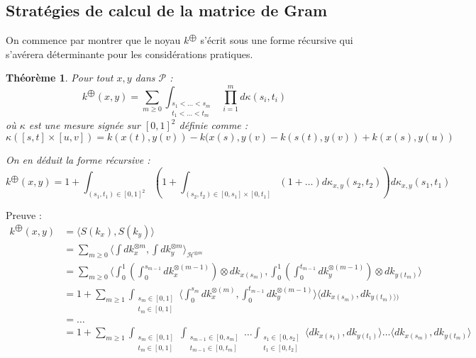 \documentclass[10pt,a4paper]{article}
\newtheorem{theoreme}{Théorème}
\begin{document}
\subsection{Stratégies de calcul de la matrice de Gram}
On commence par montrer que le noyau $k^{\bigoplus}$ s'écrit sous une forme récursive qui s’avérera déterminante pour les considérations pratiques. 
\begin{theoreme}
Pour tout $x,y$ dans $\mathcal{P}$ : 
\[
k^{\bigoplus}(x,y) = \sum_{m\geq 0} \int_{\substack{s_1 < \ldots < s_m \\ t_1 < \ldots < t_m}} \prod_{i=1}^{m} d\kappa (s_i , t_i)
\]
où $\kappa$ est une mesure signée sur $[0,1]^2$ définie comme :
\[ \kappa([s, t] \times [u,v] ) = k(x(t), y(v)) - k(x(s), y(v) - k(s(t), y(v)) + k(x(s), y(u))
\]

On en déduit la forme récursive :
\[ 
k^{\bigoplus}(x,y) = 1 + \int_{(s_1 , t_1)\in [0,1]^2} \left( 1 + \int_{(s_2 , t_2) \in [0,s_1 ]\times [0,t_1 ]} ( 1 + \ldots) d\kappa_{x,y} (s_2, t_2) \right) d\kappa_{x,y} (s_1 , t_1 )
\]
\end{theoreme}
Preuve : 
\begin{align*}
k^{\bigoplus}(x,y) &= \langle S(k_x ), S(k_y )\rangle \\
&=\sum_{m\geq 0} \langle \int dk_{x}^{\otimes m} ,  \int dk_{y}^{\otimes m} \rangle_{\mathcal{H}^{\otimes m}}\\
&=\sum_{m\geq 0} \langle \int_0^1 \left(\int_0^{s_{m-1}} dk_x^{\otimes (m-1)} \right) \otimes dk_{x(s_m )}, \int_0^1 \left(\int_0^{t_{m-1}} dk_y^{\otimes (m-1)} \right) \otimes dk_{y(t_m )} \rangle \\
&= 1 + \sum_{m\geq 1} \int_{\substack{s_m \in [0,1] \\ t_m \in [0,1]}} \langle \int_{0}^{s_m} dk_x^{\otimes (m)}, \int_0^{t_{m-1}} dk_y^{\otimes (m-1)} \rangle \langle dk_{x(s_m)} , dk_{y(t_m )\rangle )}\\
&= \ldots\\
&= 1 + \sum_{m\geq 1} \int_{\substack{s_m \in [0,1] \\ t_m \in [0,1]}} \int_{\substack{s_{m-1} \in [0,s_m] \\ t_{m-1} \in [0,t_m]}} \ldots \int_{\substack{s_{1} \in [0,s_2] \\ t_{1} \in [0,t_2]}} \langle dk_{x(s_1 )} , dk_{y(t_1 )} \rangle  \ldots  \langle dk_{x(s_m)} , dk_{y(t_m )} \rangle 
\end{align*}
\end{document}
